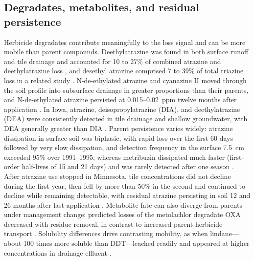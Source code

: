 \subsection{Degradates, metabolites, and residual persistence}
Herbicide degradates contribute meaningfully to the loss signal and can be more mobile than parent compounds. Deethylatrazine was found in both surface runoff and tile drainage and accounted for 10 to 27\% of combined atrazine and deethylatrazine loss \parencite{GAYNOR1995}, and desethyl atrazine comprised 7 to 39\% of total triazine loss in a related study \parencite{Gaynor2001}. N-de-ethylated atrazine and cyanazine II moved through the soil profile into subsurface drainage in greater proportions than their parents, and N-de-ethylated atrazine persisted at 0.015--0.02~ppm twelve months after application \parencite{MUIR1978}. In Iowa, atrazine, deisopropylatrazine (DIA), and deethylatrazine (DEA) were consistently detected in tile drainage and shallow groundwater, with DEA generally greater than DIA \parencite{JAYACHANDRAN1994}. Parent persistence varies widely: atrazine dissipation in surface soil was biphasic, with rapid loss over the first 60 days followed by very slow dissipation, and detection frequency in the surface 7.5~cm exceeded 95\% over 1991--1995, whereas metribuzin dissipated much faster (first-order half-lives of 15 and 21 days) and was rarely detected after one season \parencite{Moorman1999}. After atrazine use stopped in Minnesota, tile concentrations did not decline during the first year, then fell by more than 50\% in the second and continued to decline while remaining detectable, with residual atrazine persisting in soil 12 and 26 months after last application \parencite{BUHLER1993}. Metabolite fate can also diverge from parents under management change: predicted losses of the metolachlor degradate OXA decreased with residue removal, in contrast to increased parent-herbicide transport \parencite{Shipitalo2016}. Solubility differences drive contrasting mobility, as when lindane---about 100 times more soluble than DDT---leached readily and appeared at higher concentrations in drainage effluent \parencite{JOHNSTON1967}.

